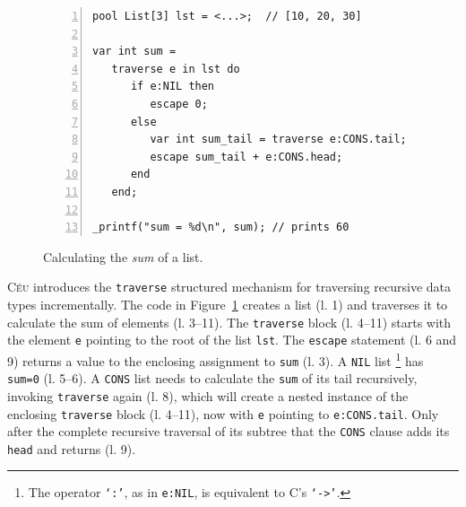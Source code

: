 \documentclass{sig-alternate}
\newcommand{\CEU}{\textsc{C\'{e}u}\xspace}
\newcommand{\code}[1] {{\small{\texttt{#1}}}}
\begin{document}
\begin{figure}[t]
\begin{lstlisting}[numbers=left,xleftmargin=3em]
pool List[3] lst = <...>;  // [10, 20, 30]

var int sum =
   traverse e in lst do
      if e:NIL then
         escape 0;
      else
         var int sum_tail = traverse e:CONS.tail;
         escape sum_tail + e:CONS.head;
      end
   end;

_printf("sum = %d\n", sum); // prints 60
\end{lstlisting}
\caption{
Calculating the \emph{sum} of a list.
\label{lst.list.sum}
}
\end{figure}

\CEU introduces the \code{traverse} structured mechanism for traversing 
recursive data types incrementally.
%
The code in Figure~\ref{lst.list.sum} creates a list (l. 1) and traverses it 
to calculate the sum of elements (l. 3--11).
The \code{traverse} block (l. 4--11) starts with the element \code{e} 
pointing to the root of the list \code{lst}.
The \code{escape} statement (l. 6 and 9) returns a value to the enclosing 
assignment to \code{sum} (l. 3).
A \code{NIL} list%
\footnote{
The operator \code{`:'}, as in \code{e:NIL}, is equivalent to C's \code{`->'}.
}
has \code{sum=0} (l. 5--6).
A \code{CONS} list needs to calculate the \code{sum} of its tail recursively, 
invoking \code{traverse} again (l. 8), which will create a nested instance of 
the enclosing \code{traverse} block (l. 4--11), now with \code{e} pointing to 
\code{e:CONS.tail}.
Only after the complete recursive traversal of its subtree that the \code{CONS} 
clause adds its \code{head} and returns (l. 9).
\end{document}
